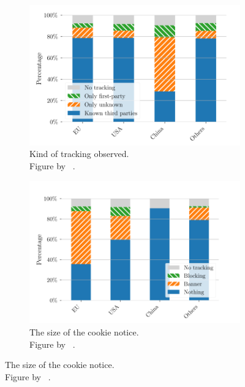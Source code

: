 \begin{figure}
    \centering
    \begin{subfigure}[b]{.5\textwidth}
        \centering
        \includegraphics[width=\textwidth, scale=0.32]{figures/tracking_kind_trans.png}
        \caption{Kind of tracking observed.\\Figure by \citeauthor{sanchez2019can}~\cite[Fig.~1]{sanchez2019can}.}
        \label{fig:tracking_kind}
    \end{subfigure}
    \begin{subfigure}[b]{.5\textwidth}
        \centering
        \includegraphics[width=\textwidth, scale=0.35]{figures/cookie_notice_size_trans.png}
        \caption{The size of the cookie notice.\\Figure by \citeauthor{sanchez2019can}~\cite[Fig.~2a]{sanchez2019can}.}
        \label{fig:notice_size}
    \end{subfigure}

\end{figure}
